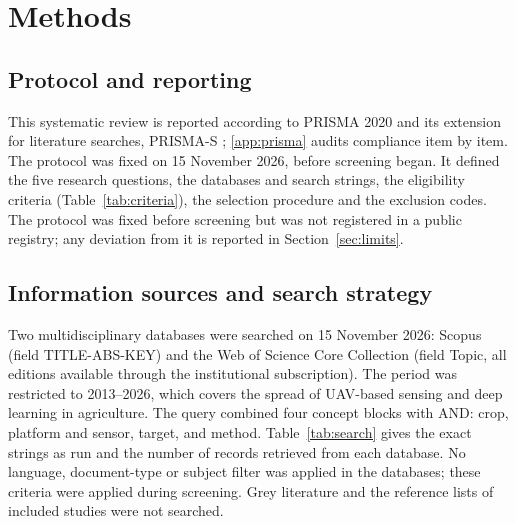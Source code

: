 \documentclass[preprint,12pt]{elsarticle}
\begin{document}
\section{Methods}\label{sec:methods}
 
\subsection{Protocol and reporting}
This systematic review is reported according to PRISMA 2020 \citep{page2021prisma} and its extension for literature searches, PRISMA-S \citep{rethlefsen2021prismas}; \ref{app:prisma} audits compliance item by item. The protocol was fixed on 15 November 2026, before screening began. It defined the five research questions, the databases and search strings, the eligibility criteria (Table~\ref{tab:criteria}), the selection procedure and the exclusion codes. The protocol was fixed before screening but was not registered in a public registry; any deviation from it is reported in Section~\ref{sec:limits}.
 
\subsection{Information sources and search strategy}
Two multidisciplinary databases were searched on 15 November 2026: Scopus (field TITLE-ABS-KEY) and the Web of Science Core Collection (field Topic, all editions available through the institutional subscription). The period was restricted to 2013--2026, which covers the spread of UAV-based sensing and deep learning in agriculture. The query combined four concept blocks with AND: crop, platform and sensor, target, and method. Table~\ref{tab:search} gives the exact strings as run and the number of records retrieved from each database. No language, document-type or subject filter was applied in the databases; these criteria were applied during screening. Grey literature and the reference lists of included studies were not searched.
 
\end{document}
